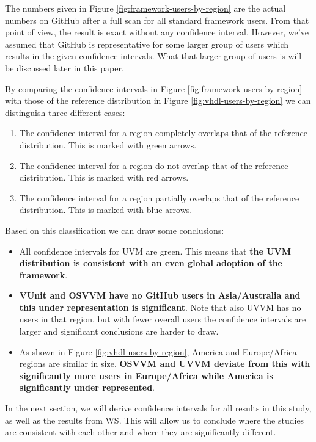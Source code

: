 \documentclass[]{article}
\providecommand{\tightlist}{%
  \setlength{\itemsep}{0pt}\setlength{\parskip}{0pt}}
\begin{document}
The numbers given in Figure \ref{fig:framework-users-by-region} are the actual numbers on GitHub after a full scan for all standard framework users. From that point of view, the result is exact without any confidence interval. However, we've assumed that GitHub is representative for some larger group of users which results in the given confidence intervals. What that larger group of users is will be discussed later in this paper.

By comparing the confidence intervals in Figure \ref{fig:framework-users-by-region} with those of the reference distribution in Figure \ref{fig:vhdl-users-by-region} we can distinguish three different cases:

\begin{enumerate}
\def\labelenumi{\arabic{enumi}.}
\tightlist
\item
  The confidence interval for a region completely overlaps that of the reference distribution. This is marked with green arrows.
\item
  The confidence interval for a region do not overlap that of the reference distribution. This is marked with red arrows.
\item
  The confidence interval for a region partially overlaps that of the reference distribution. This is marked with blue arrows.
\end{enumerate}

Based on this classification we can draw some conclusions:

\begin{itemize}
\tightlist
\item
  All confidence intervals for UVM are green. This means that \textbf{the UVM distribution is consistent with an even global adoption of the framework}.
\item
  \textbf{VUnit and OSVVM have no GitHub users in Asia/Australia and this under representation is significant}. Note that also UVVM has no users in that region, but with fewer overall users the confidence intervals are larger and significant conclusions are harder to draw.
\item
  As shown in Figure \ref{fig:vhdl-users-by-region}, America and Europe/Africa regions are similar in size. \textbf{OSVVM and UVVM deviate from this with significantly more users in Europe/Africa while America is significantly under represented}.
\end{itemize}

In the next section, we will derive confidence intervals for all results in this study, as well as the results from WS. This will allow us to conclude where the studies are consistent with each other and where they are significantly different.

\printbibliography
\end{document}
